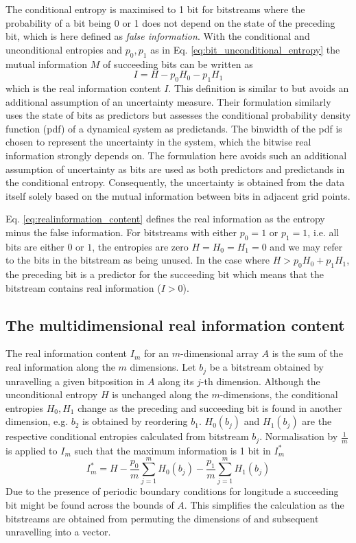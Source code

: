 The conditional entropy is maximised to 1 bit for bitstreams where the probability of a bit being 0 or 1 does not depend on the state of the
preceding bit, which is here defined as \emph{false information}. With the conditional and unconditional entropies and $p_0,p_1$ as in
Eq. \ref{eq:bit_unconditional_entropy} the mutual information $M$ of succeeding bits can be written as
	\begin{equation}
	I = H - p_0H_0 - p_1H_1
	\label{eq:realinformation_content}
	\end{equation}
which is the real information content $I$. This definition is similar to \cite{Jeffress2017} but avoids an additional assumption of an uncertainty
measure. Their formulation similarly uses the state of bits as predictors but assesses the conditional probability density function (pdf) of a
dynamical system as predictands. The binwidth of the pdf is chosen to represent the uncertainty in the system, which the bitwise real information
strongly depends on. The formulation here avoids such an additional assumption of uncertainty as bits are used as both predictors and
predictands in the conditional entropy. Consequently, the uncertainty is obtained from the data itself solely based on the mutual information
between bits in adjacent grid points.

Eq. \ref{eq:realinformation_content} defines the real information as the entropy minus the false information. For bitstreams with either $p_0 = 1$
or $p_1=1$, i.e. all bits are either $0$ or $1$, the entropies are zero $H = H_0 = H_1 = 0$ and we may refer to the bits in the bitstream as being unused.
In the case where $H > p_0H_0 + p_1H_1$, the preceding bit is a predictor for the succeeding bit which means that the bitstream contains
real information ($I > 0$).

\subsection{The multidimensional real information content}

The real information content $I_m$ for an $m$-dimensional array $A$ is the sum of the real information along the $m$ dimensions.
Let $b_j$ be a bitstream obtained by unravelling a given bitposition in $A$ along its $j$-th dimension. 
Although the unconditional entropy $H$ is unchanged along the $m$-dimensions, the conditional entropies $H_0,H_1$ change as the
preceding and succeeding bit is found in another dimension, e.g. $b_2$ is obtained by reordering $b_1$. $H_0(b_j)$ and $H_1(b_j)$
are the respective conditional entropies calculated from bitstream $b_j$. Normalisation by $\tfrac{1}{m}$  is applied to $I_m$ such
that the maximum information is 1 bit in $I_m^*$
	\begin{equation}
	I_m^* = H - \frac{p_0}{m} \sum_{j=1}^mH_0(b_j) - \frac{p_1}{m}\sum_{j=1}^mH_1(b_j)
	\end{equation}
Due to the presence of periodic boundary conditions for longitude a succeeding bit might be found across the bounds of $A$.
This simplifies the calculation as the bitstreams are obtained from permuting the dimensions of  and subsequent unravelling into a vector.

